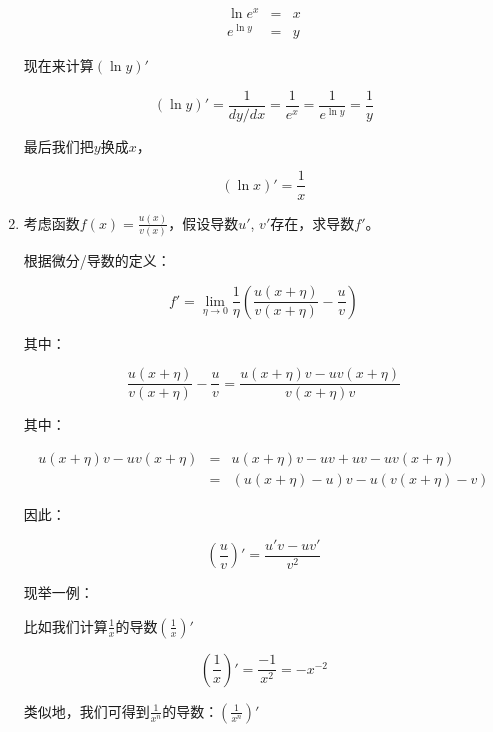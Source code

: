 \begin{enumerate}
\begin{eqnarray*}
\ln e^x & = & x \\
e^{\ln y} & = & y
\end{eqnarray*}

现在来计算$(\ln y )'$

\begin{equation*}
( \ln y)' = \frac{1}{dy/dx} = \frac{1}{e^x} = \frac{1}{e^{\ln y}} = \frac{1}{y} 
\end{equation*}

最后我们把$y$换成$x$，

\begin{equation}
( \ln x)' = \frac{1}{x}
\end{equation}

\item

考虑函数$f(x) = \frac{u(x)}{v(x)}$，假设导数$u'$, $v'$存在，求导数$f'$。

根据微分/导数的定义：

\begin{equation*}
f' = \lim\limits_{\eta \to 0} \frac{1}{\eta} \left( \frac{u(x+\eta)}{v(x+\eta)} - \frac{u}{v} \right)
\end{equation*}

其中：

\begin{equation*}
\frac{u(x+\eta)}{v(x+\eta)} - \frac{u}{v} = \frac{ u(x+\eta) v - u v(x+\eta)  }{ v(x+\eta) v }
\end{equation*}

其中：

\begin{eqnarray*}
u(x+\eta) v - u v(x+\eta) & = & u(x+\eta) v - uv + u v - u v(x+\eta) \\
{} & = & (u(x+\eta)-u)v - u(v(x+\eta)-v )
\end{eqnarray*}

因此：

\begin{equation}
\left( \frac{u}{v} \right)' = \frac{ u' v - u v' }{v^2}
\end{equation}

现举一例：

比如我们计算$\frac{1}{x}$的导数$\left( \frac{1}{x} \right)'$

\begin{equation*}
\left( \frac{1}{x} \right)' = \frac{ - 1 }{x^2} = -x^{-2}
\end{equation*}

类似地，我们可得到$\frac{1}{x^n} $的导数：$\left( \frac{1}{x^n}  \right)'$


\end{enumerate}

